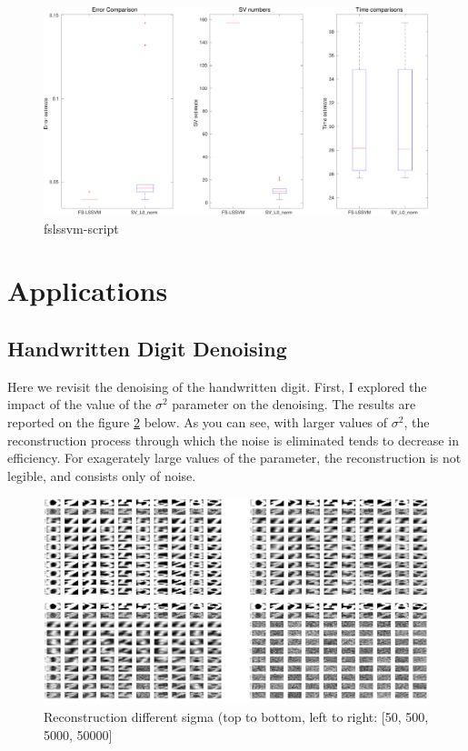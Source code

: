 \documentclass[11pt, a4paper]{article}
\begin{document}
\begin{figure}[H]
  \centering
  \includegraphics[scale=.36]{fslssvm_script.pdf}
  \caption{fslssvm-script}
  \label{fig:fslssvm_script}
\end{figure}


\section{Applications}

\subsection{Handwritten Digit Denoising}

Here we revisit the denoising of the handwritten digit. First, I
explored the impact of the value of the $\sigma^2$ parameter on the
denoising. The results are reported on the figure
\ref{fig:nndigits_all} below. As you can see, with larger values of
$\sigma^2$, the reconstruction process through which the noise is
eliminated tends to decrease in efficiency. For exagerately large
values of the parameter, the reconstruction is not legible, and
consists only of noise.

\begin{figure}[H]
  \centering
  \includegraphics[scale=.13]{nndigits_all.png}
  \caption{Reconstruction different sigma (top to bottom, left to
    right: [50, 500, 5000, 50000]}
  \label{fig:nndigits_all}
\end{figure}
\end{document}
